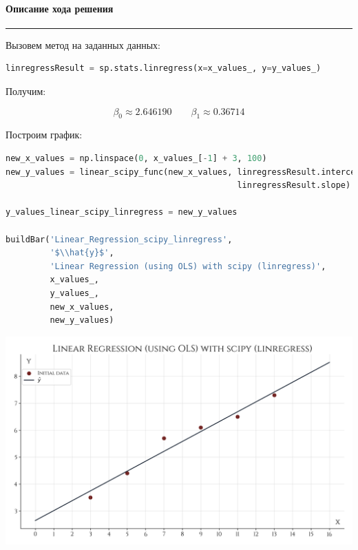 \documentclass[a4paper, 14pt]{extarticle}
\begin{document}
\paragraph*{{Описание хода решения}}\vspace{-20pt}\rule{\linewidth}{0.1mm}

Вызовем метод на заданных данных:

\begin{center}
    \begin{lstlisting}[language=Python]
linregressResult = sp.stats.linregress(x=x_values_, y=y_values_)
    \end{lstlisting}
\end{center}

Получим:

\begin{equation*}
    \beta_0 \approx 2.646190 \qquad \beta_1 \approx 0.36714
\end{equation*}

Построим график:

\begin{center}
    \begin{lstlisting}[language=Python]
new_x_values = np.linspace(0, x_values_[-1] + 3, 100)
new_y_values = linear_scipy_func(new_x_values, linregressResult.intercept, 
                                               linregressResult.slope)

y_values_linear_scipy_linregress = new_y_values

buildBar('Linear_Regression_scipy_linregress', 
         '$\\hat{y}$', 
         'Linear Regression (using OLS) with scipy (linregress)', 
         x_values_, 
         y_values_, 
         new_x_values, 
         new_y_values)
    \end{lstlisting}
\end{center}

\begin{center}
    \includegraphics[width=1\textwidth, height=1\textheight, keepaspectratio]{Linear_Regression_scipy_linregress} \\
\end{center}
\end{document}
